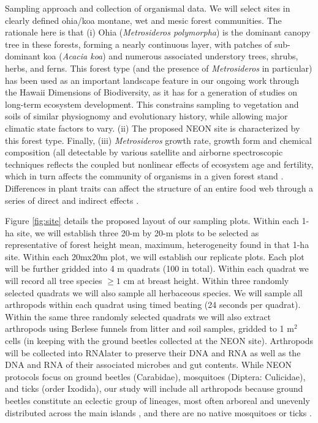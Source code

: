 \documentclass[11pt]{article}
\makeatletter
\renewcommand{\paragraph}{\@startsection{paragraph}{4}{\z@}
  {1ex \@plus 1ex \@minus .2ex}{-1em}
  {\normalfont\normalsize\it}
}
\makeatother
\begin{document}
\paragraph{Sampling approach and collection of organismal data.}
We will select sites in clearly defined ohia/koa montane, wet and
mesic forest communities. The rationale here is that (i) Ohia
({\it Metrosideros polymorpha}) is the dominant canopy tree in these
forests, forming a nearly continuous layer, with patches of
sub-dominant koa ({\it Acacia koa}) and numerous associated understory
trees, shrubs, herbs, and ferns. This forest type (and the presence of
{\it Metrosideros} in particular) has been used as an important landscape
feature in our ongoing work through the Hawaii Dimensions of
Biodiversity, as it has for a generation of studies on long-term
ecosystem development. This constrains sampling to vegetation and
soils of similar physiognomy and evolutionary history, while allowing
major climatic state factors to vary. (ii) The proposed NEON site is
characterized by this forest type. Finally, (iii) {\it Metrosideros} growth
rate, growth form and chemical composition (all detectable by various
satellite and airborne spectroscopic techniques \citep{asner2006,
  asner2009, asner2012} reflects the coupled but nonlinear effects of
ecosystem age and fertility, which in turn affects the community of
organisms in a given forest stand \citep{crews1995,
  gruner2007}. Differences in plant traits can affect the structure of
an entire food web through a series of direct and indirect effects
\citep{gruner2005, bukovinszky2008}.

Figure \ref{fig:site} details the proposed layout of our sampling
plots. Within each 1-ha site, we will establish three 20-m by 20-m
plots to be selected as representative of forest height mean, maximum,
heterogeneity found in that 1-ha site. Within each 20mx20m plot, we
will establish our replicate plots.  Each plot will be further gridded
into 4 m quadrats (100 in total).  Within each quadrat we will record
all tree species $\geq 1$ cm at breast height.  Within three randomly
selected quadrats we will also sample all herbaceous species.  We will
sample all arthropods within each quadrat using timed beating (24
seconds per quadrat).  Within the same three randomly selected
quadrats we will also extract arthropods using Berlese funnels from
litter and soil samples, gridded to 1 m$^2$ cells (in keeping with the
ground beetles collected at the NEON site).  Arthropods will be
collected into RNAlater to preserve their DNA and RNA as well as the
DNA and RNA of their associated microbes and gut contents.  While NEON
protocols focus on ground beetles (Carabidae), mosquitoes (Diptera:
Culicidae), and ticks (order Ixodida), our study will include all
arthropods because ground beetles constitute an eclectic group of
lineages, most often arboreal and unevenly distributed across the main
islands \citep{Liebherr2000}, and there are no native mosquitoes or
ticks \citep{nishida2002}.
\end{document}

